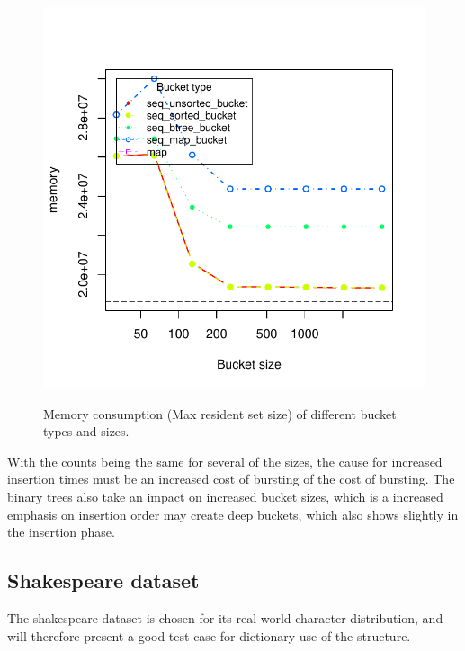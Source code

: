 \begin{figure}[!h]
    \includegraphics[width=1.0\textwidth]{plots/i7_30m_memory}
    \label{fig:memory_30m}
    \caption{Memory consumption (Max resident set size) of different
    bucket types and sizes.}
\end{figure}

With the counts being the same for several of the sizes, the cause for increased insertion times
must be an increased cost of bursting of the cost of bursting.
The binary trees also take an impact on increased bucket sizes, which is
a 
increased emphasis on insertion order may create deep buckets, which
also shows slightly in the insertion phase.


\subsection{Shakespeare dataset}
The shakespeare dataset is chosen for its real-world character distribution, and will
therefore present a good test-case for dictionary use of the structure.

